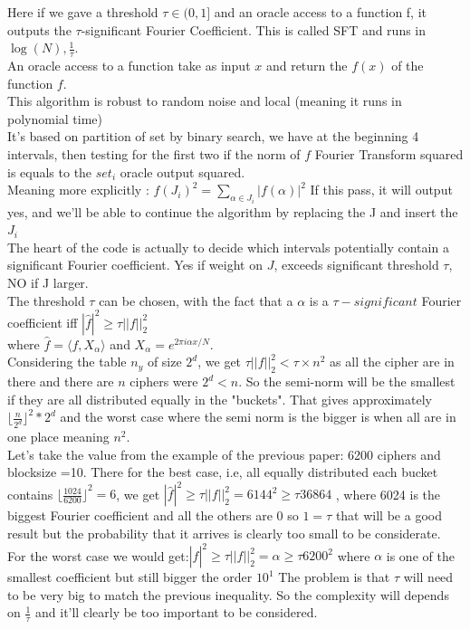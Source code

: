 \documentclass{article}
\begin{document}
Here if we gave a threshold $\tau \in (0,1]$ and an oracle access to a function f, it outputs the $\tau$-significant Fourier Coefficient. This is called SFT and runs in $\log(N),\frac{1}{\tau}$.\\
An oracle access to a function take as input $x$ and return the $f(x)$ of the function $f$.\\
This algorithm is robust to random noise and local (meaning it runs in polynomial time)\\
It's based on partition of set by binary search, we have at the beginning 4 intervals, then testing for the first two if the norm of $f$ Fourier Transform squared is equals to the $set_i$ oracle output squared.\\
Meaning more explicitly : $f(J_i)^2 = \sum_{\alpha \in J_i}{|f(\alpha)|^2}$ If this pass, it will output yes, and we'll be able to continue the algorithm by replacing the J and insert the $J_i$\\
The heart of the code is actually to decide which intervals potentially contain a significant Fourier coefficient. Yes if weight on $J$, exceeds significant threshold $\tau$, NO if J larger.\\
The threshold $\tau$ can be chosen, with the fact that a $\alpha$ is a $\tau -significant$ Fourier coefficient iff $|\hat{f}|^2 \geq \tau||f||^{2}_2$\\ where $\hat{f} = \langle f,X_{\alpha} \rangle$ and $X_{\alpha} = e^{2\pi i \alpha x/N}$.\\
Considering the table $n_y$ of size $2^d$, we get $\tau||f||^{2}_2 < \tau \times n^2$ as all the cipher are in there and there are $n$ ciphers were $2^d <n$. So the semi-norm will be the smallest if they are all distributed equally in the "buckets". That gives approximately ${\lfloor \frac{n}{2^d} \rfloor}^{2}*2^d$ and the worst case where the semi norm is the bigger is when all are in one place meaning $n^2$.\\
Let's take the value from the example of the previous paper: 6200 ciphers and blocksize =10. There for the best case, i.e, all equally distributed each bucket contains ${\lfloor \frac{1024}{6200} \rfloor}^2 = 6$, we get $|\hat{f}|^2 \geq \tau||f||^{2}_2 =  6144^2 \geq \tau 36864$ , where 6024 is the biggest Fourier coefficient and all the others are 0 so $ 1 = \tau$ that will be a good result but the probability that it arrives is clearly too small to be considerate.\\
For the worst case we would get:$|\hat{f}|^2 \geq \tau||f||^{2}_2 =  \alpha \geq \tau 6200^2$ where $\alpha$ is one of the smallest coefficient but still bigger the order $10^1$  
The problem is that $\tau$ will need to be very big to match the previous inequality. So the complexity will depends on $\frac{1}{\tau}$ and it'll clearly be too important to be considered.\\
\end{document}
